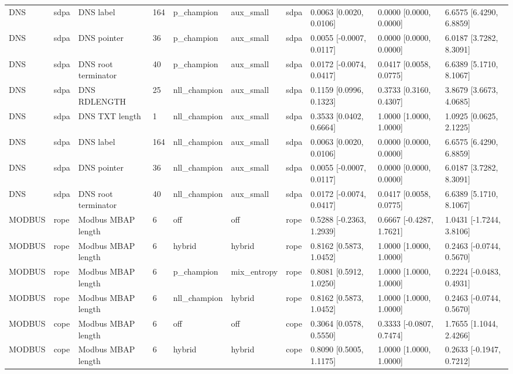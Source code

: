 \begin{tabular}{llllllllll}
DNS & sdpa & DNS label & 164 & p\_champion & aux\_small & sdpa & 0.0063 [0.0020, 0.0106] & 0.0000 [0.0000, 0.0000] & 6.6575 [6.4290, 6.8859] \\
DNS & sdpa & DNS pointer & 36 & p\_champion & aux\_small & sdpa & 0.0055 [-0.0007, 0.0117] & 0.0000 [0.0000, 0.0000] & 6.0187 [3.7282, 8.3091] \\
DNS & sdpa & DNS root terminator & 40 & p\_champion & aux\_small & sdpa & 0.0172 [-0.0074, 0.0417] & 0.0417 [0.0058, 0.0775] & 6.6389 [5.1710, 8.1067] \\
DNS & sdpa & DNS RDLENGTH & 25 & nll\_champion & aux\_small & sdpa & 0.1159 [0.0996, 0.1323] & 0.3733 [0.3160, 0.4307] & 3.8679 [3.6673, 4.0685] \\
DNS & sdpa & DNS TXT length & 1 & nll\_champion & aux\_small & sdpa & 0.3533 [0.0402, 0.6664] & 1.0000 [1.0000, 1.0000] & 1.0925 [0.0625, 2.1225] \\
DNS & sdpa & DNS label & 164 & nll\_champion & aux\_small & sdpa & 0.0063 [0.0020, 0.0106] & 0.0000 [0.0000, 0.0000] & 6.6575 [6.4290, 6.8859] \\
DNS & sdpa & DNS pointer & 36 & nll\_champion & aux\_small & sdpa & 0.0055 [-0.0007, 0.0117] & 0.0000 [0.0000, 0.0000] & 6.0187 [3.7282, 8.3091] \\
DNS & sdpa & DNS root terminator & 40 & nll\_champion & aux\_small & sdpa & 0.0172 [-0.0074, 0.0417] & 0.0417 [0.0058, 0.0775] & 6.6389 [5.1710, 8.1067] \\
MODBUS & rope & Modbus MBAP length & 6 & off & off & rope & 0.5288 [-0.2363, 1.2939] & 0.6667 [-0.4287, 1.7621] & 1.0431 [-1.7244, 3.8106] \\
MODBUS & rope & Modbus MBAP length & 6 & hybrid & hybrid & rope & 0.8162 [0.5873, 1.0452] & 1.0000 [1.0000, 1.0000] & 0.2463 [-0.0744, 0.5670] \\
MODBUS & rope & Modbus MBAP length & 6 & p\_champion & mix\_entropy & rope & 0.8081 [0.5912, 1.0250] & 1.0000 [1.0000, 1.0000] & 0.2224 [-0.0483, 0.4931] \\
MODBUS & rope & Modbus MBAP length & 6 & nll\_champion & hybrid & rope & 0.8162 [0.5873, 1.0452] & 1.0000 [1.0000, 1.0000] & 0.2463 [-0.0744, 0.5670] \\
MODBUS & cope & Modbus MBAP length & 6 & off & off & cope & 0.3064 [0.0578, 0.5550] & 0.3333 [-0.0807, 0.7474] & 1.7655 [1.1044, 2.4266] \\
MODBUS & cope & Modbus MBAP length & 6 & hybrid & hybrid & cope & 0.8090 [0.5005, 1.1175] & 1.0000 [1.0000, 1.0000] & 0.2633 [-0.1947, 0.7212] \\

\end{tabular}
